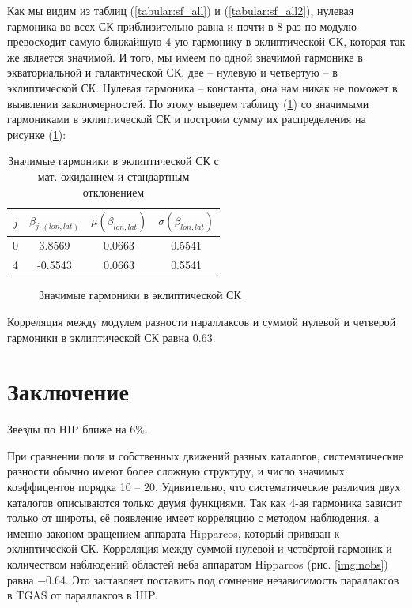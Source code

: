 \documentclass[14pt]{article} %
\begin{document}
Как мы видим из таблиц (\ref{tabular:sf_all}) и (\ref{tabular:sf_all2}), нулевая гармоника во всех СК приблизительно равна и почти в 8 раз по модулю превосходит самую ближайшую 4-ую гармонику в эклиптической СК, которая так же является значимой. И того, мы имеем по одной значимой гармонике в экваториальной и галактической СК, две -- нулевую и четвертую -- в эклиптической СК. Нулевая гармоника -- константа, она нам никак не поможет  в выявлении закономерностей. По этому выведем таблицу (\ref{tabular:sf_04}) со значимыми гармониками в эклиптической СК и построим сумму их распределения на рисунке (\ref{img:sfff}):

\begin{table}[h]
\centering
\caption{Значимые гармоники в эклиптической СК с мат. ожиданием и стандартным отклонением}
\label{tabular:sf_04}
\begin{tabular}{|c|c|c|c|}
\hline 	
$j$ &$\beta_{j,(lon,lat)}$ & $\mu(\beta_{lon,lat})$ & $\sigma(\beta_{lon,lat})$\\
\hline 	
0 &3.8569 &0.0663 &0.5541\\
4 &-0.5543 &0.0663 &0.5541\\
\hline 	
\end{tabular}
\end{table}

\begin{figure}[h!]
\caption{Значимые гармоники в эклиптической СК}
\label{img:sfff}
\end{figure}

Корреляция между модулем разности параллаксов и суммой нулевой и четверой гармоники в эклиптической СК равна 0.63. 

\section{Заключение}\label{conclusion}
Звезды по HIP ближе на $6\%$.

При сравнении поля и собственных движений разных каталогов, систематические разности обычно имеют более сложную структуру, и число значимых коэффицентов порядка 10 -- 20. Удивительно, что систематические различия двух каталогов описываются только двумя функциями. Так как 4-ая гармоника зависит только от широты, её появление имеет корреляцию с методом наблюдения, а именно законом вращением аппарата Hipparcos, который привязан к эклиптической СК. Корреляция между суммой нулевой и четвёртой гармоник и количеством наблюдений областей неба аппаратом Hipparcos (рис. \ref{img:nobs}) равна $-0.64$. Это заставляет поставить под сомнение независимость параллаксов в TGAS от параллаксов в HIP.
\end{document}
